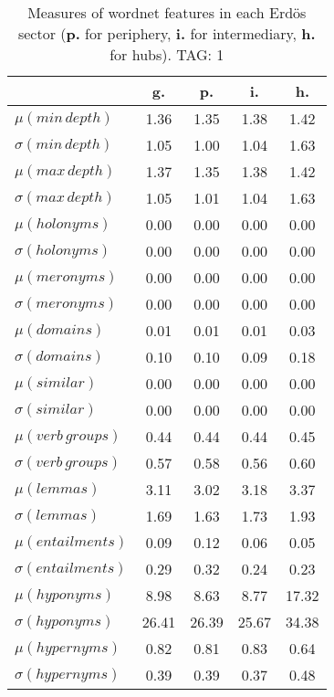 \begin{table}[h!]
\begin{center}
\begin{tabular}{| l || c | c | c | c |}\hline
 & {\bf g.} & {\bf p.} & {\bf i.} & {\bf h.} \\\hline\hline
$\mu(min\,depth)$ & 1.36  & 1.35  & 1.38  & 1.42 \\
$\sigma(min\,depth)$ & 1.05  & 1.00  & 1.04  & 1.63 \\\hline
$\mu(max\,depth)$ & 1.37  & 1.35  & 1.38  & 1.42 \\
$\sigma(max\,depth)$ & 1.05  & 1.01  & 1.04  & 1.63 \\\hline
$\mu(holonyms)$ & 0.00  & 0.00  & 0.00  & 0.00 \\
$\sigma(holonyms)$ & 0.00  & 0.00  & 0.00  & 0.00 \\\hline
$\mu(meronyms)$ & 0.00  & 0.00  & 0.00  & 0.00 \\
$\sigma(meronyms)$ & 0.00  & 0.00  & 0.00  & 0.00 \\\hline
$\mu(domains)$ & 0.01  & 0.01  & 0.01  & 0.03 \\
$\sigma(domains)$ & 0.10  & 0.10  & 0.09  & 0.18 \\\hline
$\mu(similar)$ & 0.00  & 0.00  & 0.00  & 0.00 \\
$\sigma(similar)$ & 0.00  & 0.00  & 0.00  & 0.00 \\\hline
$\mu(verb\,groups)$ & 0.44  & 0.44  & 0.44  & 0.45 \\
$\sigma(verb\,groups)$ & 0.57  & 0.58  & 0.56  & 0.60 \\\hline
$\mu(lemmas)$ & 3.11  & 3.02  & 3.18  & 3.37 \\
$\sigma(lemmas)$ & 1.69  & 1.63  & 1.73  & 1.93 \\\hline
$\mu(entailments)$ & 0.09  & 0.12  & 0.06  & 0.05 \\
$\sigma(entailments)$ & 0.29  & 0.32  & 0.24  & 0.23 \\\hline
$\mu(hyponyms)$ & 8.98  & 8.63  & 8.77  & 17.32 \\
$\sigma(hyponyms)$ & 26.41  & 26.39  & 25.67  & 34.38 \\\hline
$\mu(hypernyms)$ & 0.82  & 0.81  & 0.83  & 0.64 \\
$\sigma(hypernyms)$ & 0.39  & 0.39  & 0.37  & 0.48 \\\hline
\end{tabular}
\caption{Measures of wordnet features in each Erd\"os sector ({{\bf p.}} for periphery, {{\bf i.}} for intermediary, {{\bf h.}} for hubs). TAG: 1}
\end{center}
\end{table}